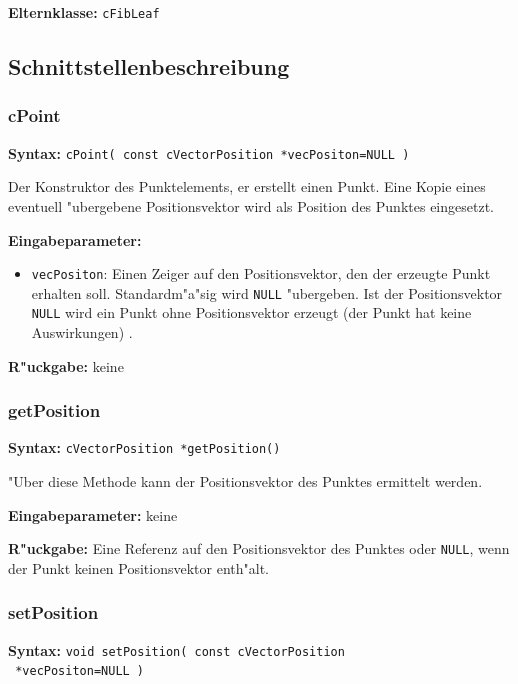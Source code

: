 \bigskip\noindent
\textbf{Elternklasse:} \verb|cFibLeaf|


\subsection{Schnittstellenbeschreibung}


\subsubsection{cPoint}

\textbf{Syntax:} \verb|cPoint( const cVectorPosition *vecPositon=NULL )|

\bigskip\noindent
Der Konstruktor des Punktelements, er erstellt einen Punkt. Eine Kopie eines eventuell "ubergebene Positionsvektor wird als Position des Punktes eingesetzt.

\bigskip\noindent
\textbf{Eingabeparameter:}
\begin{itemize}
 \item \verb|vecPositon|: Einen Zeiger auf den Positionsvektor, den der erzeugte Punkt erhalten soll. Standardm"a"sig wird \verb|NULL| "ubergeben. Ist der Positionsvektor \verb|NULL| wird ein Punkt ohne Positionsvektor erzeugt (der Punkt hat keine Auswirkungen) .
\end{itemize}

\bigskip\noindent
\textbf{R"uckgabe:} keine


\subsubsection{getPosition}

\textbf{Syntax:} \verb|cVectorPosition *getPosition()|

\bigskip\noindent
"Uber diese Methode kann der Positionsvektor des Punktes ermittelt werden.

\bigskip\noindent
\textbf{Eingabeparameter:} keine

\bigskip\noindent
\textbf{R"uckgabe:} Eine Referenz auf den Positionsvektor des Punktes oder \verb|NULL|, wenn der Punkt keinen Positionsvektor enth"alt.


\subsubsection{setPosition}

\textbf{Syntax:} \verb|void setPosition( const cVectorPosition| \\\verb| *vecPositon=NULL )|

